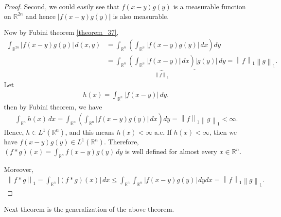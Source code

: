 \documentclass[11pt]{book}
\theoremstyle{definition}
\numberwithin{equation}{chapter}
\begin{document}
\begin{proof}
Second, we could easily see that $f(x-y)g(y)$ is a measurable function on $\mathbb{R}^{2n}$ and hence $\left|f(x-y)g(y)\right|$ is also measurable.

Now by Fubini theorem \ref{theorem_37},
\begin{align*}
    \int_{\mathbb{R}^{2n}} \left|f(x-y)g(y)\right| \, d(x,y) & = \int_{\mathbb{R}^n} \left(\int_{\mathbb{R}^n} \left|f(x-y)g(y)\right|\, dx\right) dy \\
    & = \int_{\mathbb{R}^n} \underbrace{\left(\int_{\mathbb{R}^n} \left|f(x-y)\right|\,dx \right)}_{\left\|f\right\|_1}  \left|g(y)\right|\, dy = \left\|f\right\|_1 \left\|g\right\|_1.
\end{align*}
Let
\begin{align*}
    h(x) = \int_{\mathbb{R}^n} \left|f(x-y)\right|\,dy,
\end{align*}
then by Fubini theorem, we have
\begin{align*}
    \int_{\mathbb{R}^n} h(x) \,dx = \int_{\mathbb{R}^n} \left(\int_{\mathbb{R}^n} \left|f(x-y)g(y)\right|\, dx\right) dy = \left\|f\right\|_1 \left\|g\right\|_1 < \infty.
\end{align*}
Hence, $h \in L^1(\mathbb{R}^n)$, and this means $h(x) < \infty$ a.e. If $h(x) < \infty$, then we have $f(x - y)g(y) \in L^1(\mathbb{R}^n)$. Therefore, $(f*g)(x) = \int_{\mathbb{R}^n} f(x - y)g(y)\,dy$ is well defined for almost every $x \in \mathbb{R}^n$.

Moreover,
\begin{align*}
    \left\|f*g\right\|_1 = \int_{\mathbb{R}^n} \left|(f*g)(x)\right|\,dx \leq \int_{\mathbb{R}^n} \int_{\mathbb{R}^n} \left|f(x-y)g(y)\right| \,dydx = \left\|f\right\|_1 \left\|g\right\|_1.
\end{align*}
\end{proof}

\medskip

Next theorem is the generalization of the above theorem.

\medskip
\end{document}
